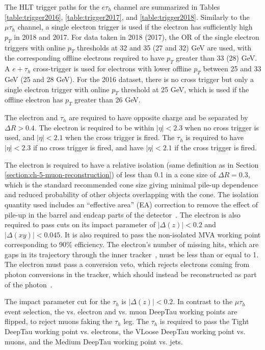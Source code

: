 The HLT trigger paths for the $e\tau_{h}$ channel are summarized in Tables \ref{table:trigger2016}, \ref{table:trigger2017}, and \ref{table:trigger2018}. Similarly to the $\mu\tau_{h}$ channel, a single electron trigger is used if the electron has sufficiently high $p_{T}$ in 2018 and 2017. For data taken in 2018 (2017), the OR of the single electron triggers with online $p_{T}$ thresholds at 32 and 35 (27 and 32) GeV are used, with the corresponding offline electrons required to have $p_{T}$ greater than 33 (28) GeV. A $e + \tau_{h}$ cross-trigger is used for electrons with lower offline $p_{T}$ between 25 and 33 GeV (25 and 28 GeV). For the 2016 dataset, there is no cross trigger but only a single electron trigger with online $p_{T}$ threshold at 25 GeV, which is used if the offline electron has $p_{T}$ greater than 26 GeV.

The electron and $\tau_h$ are required to have opposite charge and be separated by $\Delta R > 0.4$. The electron is required to be within $|\eta| < 2.3$ when no cross trigger is used, and $|\eta| < 2.1$ when the cross trigger is fired. The $\tau_{h}$ is required to have $|\eta| < 2.3$ if no cross trigger is fired, and have $|\eta| < 2.1$ if the cross trigger is fired.

The electron is required to have a relative isolation (same definition as in Section \ref{section:ch-5-muon-reconstruction}) of less than 0.1 in a cone size of $\Delta R = 0.3$, which is the standard recommended cone size giving minimal pile-up dependence and reduced probability of other objects overlapping with the cone. The isolation quantity used includes an ``effective area'' (EA) correction to remove the effect of pile-up in the barrel and endcap parts of the detector~\cite{twiki_EGamma_cutbased_ID_info}. The electron is also required to pass cuts on its impact parameter of $|\Delta(z)| < 0.2$ and $|\Delta(xy)| < 0.045$. It is also required to pass the non-isolated MVA working point corresponding to 90\% efficiency. The electron's number of missing hits, which are gaps in its trajectory through the inner tracker~\cite{twiki_EGamma_cutbased_ID_info}, must be less than or equal to 1. The electron must pass a conversion veto, which rejects electrons coming from photon conversions in the tracker, which should instead be reconstructed as part of the photon~\cite{twiki_EGamma_cutbased_ID_info}.

The impact parameter cut for the $\tau_h$ is  $|\Delta(z)| < 0.2$. In contrast to the $\mu\tau_{h}$ event selection, the vs. electron and vs. muon DeepTau working points are flipped, to reject muons faking the $\tau_{h}$ leg. The $\tau_h$ is required to pass the Tight DeepTau working point vs. electrons, the VLoose DeepTau working point vs. muons, and the Medium DeepTau working point vs. jets.

